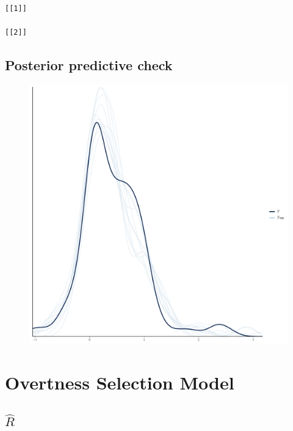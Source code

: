 \documentclass[
]{report}
\begin{document}
\begin{verbatim}
[[1]]

[[2]]
\end{verbatim}

\hypertarget{posterior-predictive-check-6}{%
\section{Posterior predictive
check}\label{posterior-predictive-check-6}}

\begin{figure}

{\centering \includegraphics[width=1\textwidth,height=\textheight]{diagnostic_plots_files/figure-pdf/unnamed-chunk-21-1.pdf}

}

\end{figure}

\hypertarget{overtness-selection-model}{%
\chapter{Overtness Selection Model}\label{overtness-selection-model}}

\hypertarget{hatr-7}{%
\section{\texorpdfstring{\(\hat{R}\)}{\textbackslash hat\{R\}}}\label{hatr-7}}
\end{document}
